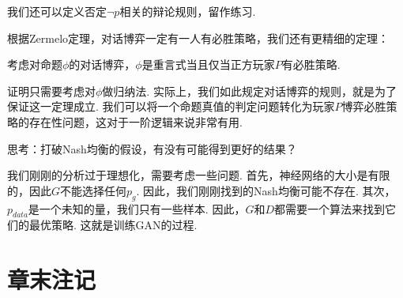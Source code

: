 我们还可以定义否定$\neg p$相关的辩论规则，留作练习. 

根据Zermelo定理，对话博弈一定有一人有必胜策略，我们还有更精细的定理：
\begin{theorem}\label{theorem:dialogue-game}
考虑对命题$\phi$的对话博弈，$\phi$是重言式当且仅当正方玩家$P$有必胜策略.
\end{theorem}

证明只需要考虑对$\phi$做归纳法. 实际上，我们如此规定对话博弈的规则，就是为了保证这一定理成立. 我们可以将一个命题真值的判定问题转化为玩家$P$博弈必胜策略的存在性问题，这对于一阶逻辑来说非常有用.

思考：打破Nash均衡的假设，有没有可能得到更好的结果？

我们刚刚的分析过于理想化，需要考虑一些问题. 首先，神经网络的大小是有限的，因此$G$不能选择任何$p_g$. 因此，我们刚刚找到的Nash均衡可能不存在. 其次，$p_{data}$是一个未知的量，我们只有一些样本. 因此，$G$和$D$都需要一个算法来找到它们的最优策略. 这就是训练GAN的过程. 

\section{章末注记}